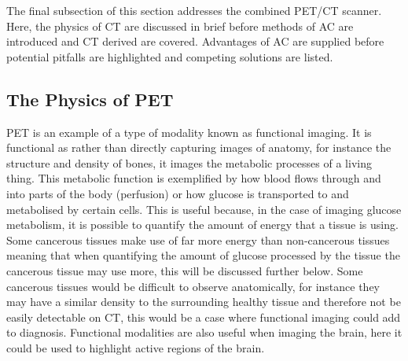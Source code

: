         The final subsection of this section addresses the combined \gls{PET}/\gls{CT} scanner. Here, the physics of \gls{CT} are discussed in brief before methods of \gls{AC} are introduced and \gls{CT} derived  are covered. Advantages of \gls{AC} are supplied before potential pitfalls are highlighted and competing solutions are listed.
        
        \subsection{The Physics of PET} \label{sec:the_physics_of_pet}
            
            \gls{PET} is an example of a type of modality known as functional imaging. It is functional as rather than directly capturing images of anatomy, for instance the structure and density of bones, it images the metabolic processes of a living thing. This metabolic function is exemplified by how blood flows through and into parts of the body (perfusion) or how glucose is transported to and metabolised by certain cells. This is useful because, in the case of imaging glucose metabolism, it is possible to quantify the amount of energy that a tissue is using. Some cancerous tissues make use of far more energy than non-cancerous tissues meaning that when quantifying the amount of glucose processed by the tissue the cancerous tissue may use more, this will be discussed further below. Some cancerous tissues would be difficult to observe anatomically, for instance they may have a similar density to the surrounding healthy tissue and therefore not be easily detectable on \gls{CT}, this would be a case where functional imaging could add to diagnosis. Functional modalities are also useful when imaging the brain, here it could be used to highlight active regions of the brain.
            
